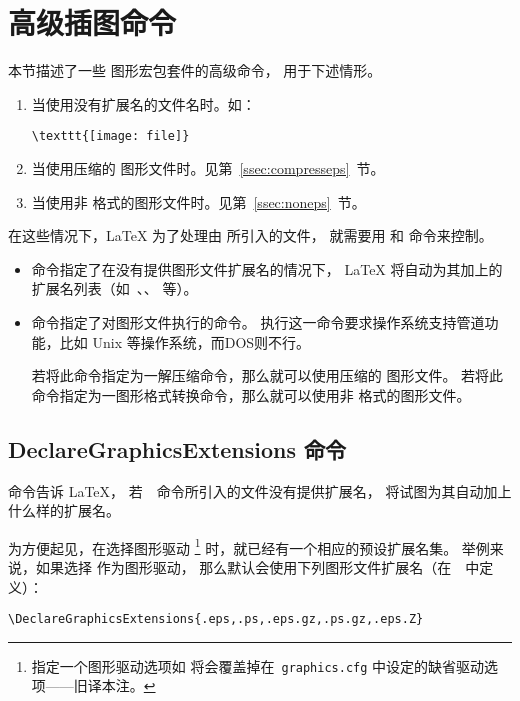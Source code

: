 \section{高级插图命令}\label{sec:adgraphcmd}
本节描述了一些 \LaTeXe{} 图形宏包套件的高级命令，
用于下述情形。
\begin{enumerate}
	\item 当使用没有扩展名的文件名时。如：
\begin{lstlisting}
\texttt{[image: file]}
\end{lstlisting}

	\item 当使用压缩的 图形文件时。见第~\ref{ssec:compresseps}~节。
	\item 当使用非 格式的图形文件时。见第~\ref{ssec:noneps}~节。
\end{enumerate}
在这些情况下，\LaTeX{} 为了处理由  所引入的文件，
就需要用  和  命令来控制。
\begin{itemize}
	\item {} 命令指定了在没有提供图形文件扩展名的情况下，
	\LaTeX{} 将自动为其加上的扩展名列表（如~、、 等）。
	\item {} 命令指定了对图形文件执行的命令。
	执行这一命令要求操作系统支持管道功能，比如 Unix 等操作系统，而DOS则不行。
	
	若将此命令指定为一解压缩命令，那么就可以使用压缩的  图形文件。
	若将此命令指定为一图形格式转换命令，那么就可以使用非 格式的图形文件。
\end{itemize}

\subsection{DeclareGraphicsExtensions 命令}\label{ssec:deextension}
 命令告诉 \LaTeX{}，
若~~命令所引入的文件没有提供扩展名，
将试图为其自动加上什么样的扩展名。

为方便起见，在选择图形驱动
\footnote{
	指定一个图形驱动选项如  将会覆盖掉在~\texttt{graphics.cfg} 中设定的缺省驱动选项——旧译本注。}
时，就已经有一个相应的预设扩展名集。
举例来说，如果选择  作为图形驱动，
那么默认会使用下列图形文件扩展名（在~~中定义）：
\begin{lstlisting}
\DeclareGraphicsExtensions{.eps,.ps,.eps.gz,.ps.gz,.eps.Z}
\end{lstlisting}

